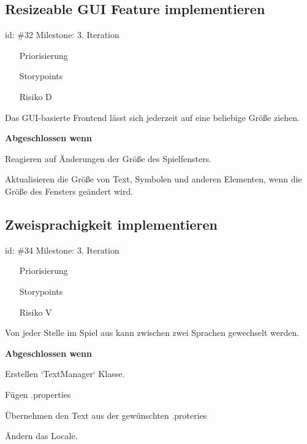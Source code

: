 \subsection*{Resizeable GUI Feature implementieren}
id: \#32 Milestone: 3. Iteration\\

\begin{itemize}
\item[Priorisierung] 
\item[Storypoints] 
\item[Risiko] D
\end{itemize}

Das GUI-basierte Frontend lässt sich jederzeit auf eine beliebige Größe ziehen.

\textbf{Abgeschlossen wenn}
\begin{todolist}
    \item[\done]  Reagieren auf Änderungen der Größe des Spielfensters.
  \item[\done]  Aktualisieren die Größe von Text, Symbolen und anderen Elementen, wenn die Größe des Fensters geändert wird.

\end{todolist}


\subsection*{Zweisprachigkeit implementieren}
id: \#34 Milestone: 3. Iteration\\

\begin{itemize}
\item[Priorisierung] 
\item[Storypoints] 
\item[Risiko] V
\end{itemize}

Von jeder Stelle im Spiel aus kann zwischen zwei Sprachen gewechselt werden.

\textbf{Abgeschlossen wenn}
\begin{todolist}
    \item[\done]  Erstellen `TextManager` Klasse.
  \item[\done]  Fügen .properties
  \item[\done]  Übernehmen den Text aus der gewünschten .proteries
  \item[\done]  Ändern das Locale.

\end{todolist}

